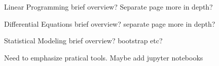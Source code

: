 \documentclass{article}
\begin{document}
Linear Programming brief overview? Separate page more in depth?

Differential Equations brief overview? separate page more in depth?

Statistical Modeling brief overview? bootstrap etc?

Need to emphasize pratical tools. Maybe add jupyter notebooks
\end{document}

